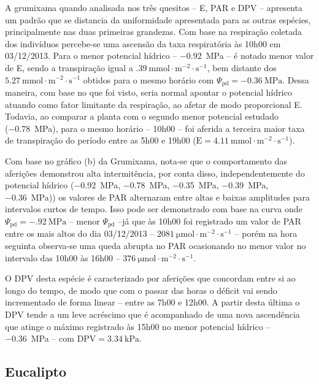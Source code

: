\documentclass[a4paper, 12pt]{article}
\numberwithin{equation}{section}
\begin{document}
	A grumixama quando analisada nos três quesitos -- E, PAR e DPV -- apresenta um padrão que se distancia da uniformidade apresentada para as outras espécies, principalmente nas duas primeiras grandezas. Com base na respiração coletada dos indivíduos percebe-se uma ascensão da taxa respiratória às 10h00 em 03/12/2013. Para o menor potencial hídrico -- \SI{-.92}{\mega\pascal} -- é notado menor valor de E, sendo a transpiração igual a $\SI{.39}{\milli\mole\cdot\meter^{-2}\cdot\second^{-1}}$, bem distante dos $\SI{5.27}{\milli\mole\cdot\meter^{-2}\cdot\second^{-1}}$ obtidos para o mesmo horário com $\Psi_{\textrm{pd}}=\SI{-0.36}{\mega\pascal}$. Dessa maneira, com base no que foi visto, seria normal apontar o potencial hídrico atuando como fator limitante da respiração, ao afetar de modo proporcional E. Todavia, ao comparar a planta com o segundo menor potencial estudado (\SI{-.78}{\mega\pascal}), para o mesmo horário -- 10h00 -- foi aferida a terceira maior taxa de transpiração do período entre as 5h00 e 19h00 ($\textrm{E}=\SI{4.11}{\milli\mole\cdot\meter^{-2}\cdot\second^{-1}}$).
	
	Com base no gráfico (b) da Grumixama, nota-se que o comportamento das aferições demonstrou alta intermitência, por conta disso, independentemente do potencial hídrico (\SI{-.92}{\mega\pascal}, \SI{-.78}{\mega\pascal}, \SI{-.35}{\mega\pascal}, \SI{-.39}{\mega\pascal}, \SI{-.36}{\mega\pascal})) os valores de PAR alternaram entre altas e baixas amplitudes para intervalos curtos de tempo. Isso pode ser demonstrado com base na curva onde $\Psi_{\textrm{pd}}=\SI{-.92}{\mega\pascal}$ -- menor $\Psi_{\textrm{pd}}$ --já que às 10h00 foi registrado um valor de PAR entre os mais altos do dia 03/12/2013 -- $\SI{2081}{\micro\mole\cdot\meter^{-2}\cdot\second^{-1}}$ -- porém na hora seguinta observa-se uma queda abrupta no PAR ocasionando no menor valor no intervalo das 10h00 às 16h00 -- $\SI{376}{\micro\mole\cdot\meter^{-2}\cdot\second^{-1}}$. 
	
	O DPV desta espécie é caracterizado por aferições que concordam entre si ao longo do tempo, de modo que com o passar das horas o déficit vai sendo incrementado de forma linear -- entre as 7h00 e 12h00. A partir desta última o DPV tende a um leve acréscimo que é acompanhado de uma nova ascendência que atinge o máximo registrado às 15h00 no menor potencial hídrico -- \SI{-.36}{\mega\pascal} -- com $\textrm{DPV}=\SI{3.34}{\kilo\pascal}$.
	
	\subsection{Eucalipto}
	
\end{document}
